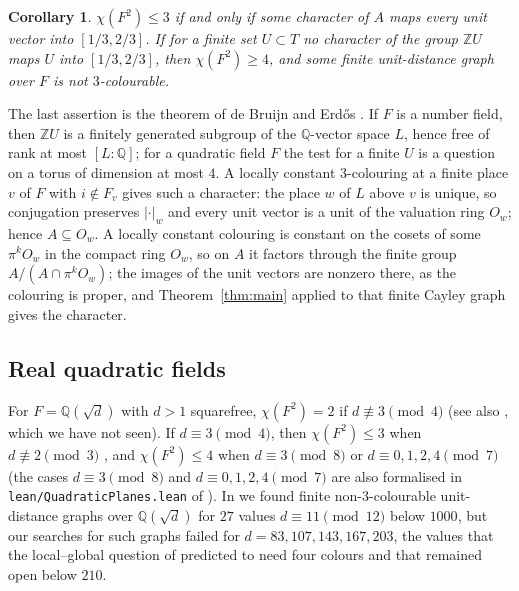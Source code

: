 \documentclass[11pt,a4paper]{amsart}
\newtheorem{corollary}[theorem]{Corollary}
\theoremstyle{definition}
\newcommand{\Q}{\mathbb{Q}}
\newcommand{\Z}{\mathbb{Z}}
\begin{document}
\begin{corollary}\label{cor:planes}
$\chi(F^2)\le3$ if and only if some character of $A$ maps every unit vector into $[1/3,2/3]$. If for a finite set
$U\subset T$ no character of the group $\Z U$ maps $U$ into $[1/3,2/3]$, then $\chi(F^2)\ge4$, and some finite
unit-distance graph over $F$ is not $3$-colourable.
\end{corollary}

The last assertion is the theorem of de Bruijn and Erd\H{o}s \cite{dBE}. If $F$ is a number field, then $\Z U$ is
a finitely generated subgroup of the $\Q$-vector space $L$, hence free of rank at most $[L:\Q]$; for a quadratic
field $F$ the test for a finite $U$ is a question on a torus of dimension at most $4$. A locally constant
$3$-colouring at a finite place $v$ of $F$ with $i\notin F_v$ \cite{Fischer1990,Moorhouse,LG} gives such a character: the
place $w$ of $L$ above $v$ is unique, so conjugation preserves $|\cdot|_w$ and every unit vector is a unit of the
valuation ring $O_w$; hence $A\subseteq O_w$. A locally constant colouring is constant on the cosets of some
$\pi^kO_w$ in the compact ring $O_w$, so on $A$ it factors through the finite group $A/(A\cap\pi^kO_w)$; the images
of the unit vectors are nonzero there, as the colouring is proper, and Theorem~\ref{thm:main} applied to that finite
Cayley graph gives the character.

\subsection{Real quadratic fields}
For $F=\Q(\sqrt d)$ with $d>1$ squarefree, $\chi(F^2)=2$ if $d\not\equiv3\pmod4$
\cite{Fischer1990,Moorhouse} (see also \cite{Johnson1987}, which we have not seen). If $d\equiv3\pmod4$, then $\chi(F^2)\le3$ when $d\not\equiv2\pmod3$
\cite{Fischer1990,Moorhouse}, and $\chi(F^2)\le4$ when $d\equiv3\pmod8$ \cite[Theorem~10]{Fischer1990} or
$d\equiv0,1,2,4\pmod7$ \cite{Moorhouse} (the cases $d\equiv3\pmod8$ and $d\equiv0,1,2,4\pmod7$ are also formalised in
\texttt{lean/QuadraticPlanes.lean} of \cite{Repo}). In \cite{QP} we found finite non-$3$-colourable unit-distance graphs over
$\Q(\sqrt d)$ for $27$ values $d\equiv11\pmod{12}$ below $1000$, but our searches for such graphs failed for
$d=83,107,143,167,203$, the values that the local--global question of \cite{LG} predicted to need four colours and
that remained open below $210$.
\end{document}
